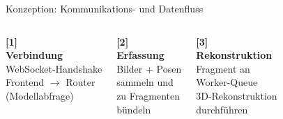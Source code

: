 
\begin{frame}{Konzeption: Kommunikations- und Datenfluss}{}
    \begin{columns}[T]
        \begin{tcolorbox}[box1, height=2.75cm, boxsep=0.2em]
            \centering
            \textcolor{blue!70}{\textbf{[1]}}\\
            \textbf{Verbindung}\\
            \vspace{0.2em}
            \small WebSocket-Handshake\\
            Frontend $\to$ Router\\
            (Modellabfrage)
        \end{tcolorbox}
        
        \begin{tcolorbox}[box2, height=2.75cm, boxsep=0.2em]
            \centering
            \textcolor{teal!70}{\textbf{[2]}}\\
            \textbf{Erfassung}\\
            \vspace{0.2em}
            \small Bilder + Posen\\
            sammeln und\\
            zu Fragmenten\\
            bündeln
        \end{tcolorbox}
        
        \begin{tcolorbox}[box3, height=2.75cm, boxsep=0.2em]
            \centering
            \textcolor{orange!70}{\textbf{[3]}}\\
            \textbf{Rekonstruktion}\\
            \vspace{0.2em}
            \small Fragment an\\
            Worker-Queue\\
            3D-Rekonstruktion\\
            durchführen
        \end{tcolorbox}
        

\end{columns}
\end{frame}
